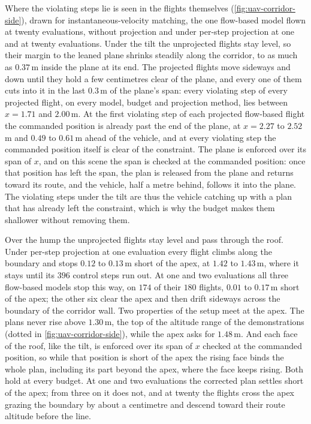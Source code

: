 Where the violating steps lie is seen in the flights themselves (\autoref{fig:uav-corridor-side}), drawn
for instantaneous-velocity matching, the one flow-based model flown at twenty evaluations, without
projection and under per-step projection at one and at twenty evaluations. Under the tilt the unprojected
flights stay level, so their margin to the leaned plane shrinks steadily along the corridor, to as much
as $0.37$\,m inside the plane at its end. The projected flights move sideways and down until they hold a few
centimetres clear of the plane, and every one of them cuts into it in the last $0.3$\,m of the plane's
span: every violating step of every projected flight, on every model, budget and projection method, lies
between $x=1.71$ and $2.00$\,m. At the first violating step of each projected flow-based flight the
commanded position is already past the end of the plane, at $x=2.27$ to $2.52$\,m and $0.49$ to
$0.61$\,m ahead of the vehicle, and at every violating step the commanded position itself is clear of the
constraint. The plane is enforced over its span of $x$, and on this scene the span is checked at the
commanded position: once that position has left the span, the plan is released from the plane and
returns toward its route, and the vehicle, half a metre behind, follows it into the plane. The violating
steps under the tilt are thus the vehicle catching up with a plan that has already left the constraint,
which is why the budget makes them shallower without removing them.

Over the hump the unprojected flights stay level and pass through the roof. Under per-step projection at one
evaluation every flight climbs along the boundary and stops $0.12$ to $0.13$\,m short of the apex, at
$1.42$ to $1.43$\,m, where it stays until its $396$ control steps run out. At one and two evaluations
all three flow-based models stop this way, on $174$ of their $180$ flights, $0.01$ to $0.17$\,m short of
the apex; the other six clear the apex and then drift sideways across the boundary of the corridor wall.
Two properties of the setup meet at the apex. The plans never rise above $1.30$\,m, the top of the
altitude range of the demonstrations (dotted in \autoref{fig:uav-corridor-side}), while the apex asks for
$1.48$\,m. And each face of the roof, like the tilt, is enforced over its span of $x$ checked at the
commanded position, so while that position is short of the apex the rising face binds the whole plan,
including its part beyond the apex, where the face keeps rising. Both hold at every budget. At one and
two evaluations the corrected plan settles short of the apex; from three on it does not, and at twenty
the flights cross the apex grazing the boundary by about a centimetre and descend toward their route
altitude before the line.

